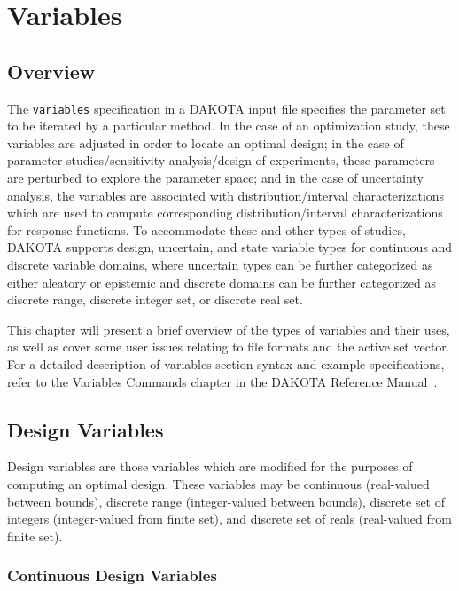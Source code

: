 \chapter{Variables}\label{variables}

\section{Overview}\label{variables:overview}

The \texttt{variables} specification in a DAKOTA input file specifies
the parameter set to be iterated by a particular method. In the case
of an optimization study, these variables are adjusted in order to
locate an optimal design; in the case of parameter studies/sensitivity
analysis/design of experiments, these parameters are perturbed to
explore the parameter space; and in the case of uncertainty analysis,
the variables are associated with distribution/interval
characterizations which are used to compute corresponding
distribution/interval characterizations for response functions. To
accommodate these and other types of studies, DAKOTA supports design,
uncertain, and state variable types for continuous and discrete
variable domains, where uncertain types can be further categorized as
either aleatory or epistemic and discrete domains can be further
categorized as discrete range, discrete integer set, or discrete real
set.

This chapter will present a brief overview of the types of variables
and their uses, as well as cover some user issues relating to file
formats and the active set vector.  For a detailed description of
variables section syntax and example specifications, refer to the
Variables Commands chapter in the DAKOTA Reference Manual~\cite{RefMan}.


\section{Design Variables}\label{variables:design}


Design variables are those variables which are modified for the
purposes of computing an optimal design. These variables may be
continuous (real-valued between bounds), discrete range
(integer-valued between bounds), discrete set of integers
(integer-valued from finite set), and discrete set of reals
(real-valued from finite set).

\subsection{Continuous Design Variables}\label{variables:design:cdv}

